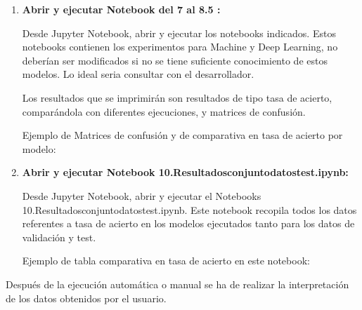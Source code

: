 \begin{enumerate}
\begin{enumerate}
 
    \item
    \textbf{Abrir y ejecutar Notebook del 7 al 8.5 :} 
    
    Desde Jupyter Notebook, abrir y ejecutar los notebooks indicados.
    Estos notebooks contienen los experimentos para Machine y Deep Learning, no deberían ser modificados si no se tiene suficiente conocimiento de estos modelos. Lo ideal seria consultar con el desarrollador.
    
    Los resultados que se imprimirán son resultados de tipo tasa de acierto, comparándola con diferentes ejecuciones, y matrices de confusión.
    
    Ejemplo de Matrices de confusión y de comparativa en tasa de acierto por modelo:
    
    
    
   \item
    \textbf{Abrir y ejecutar Notebook 10.Resultadosconjuntodatostest.ipynb:} 
    
    Desde Jupyter Notebook, abrir y ejecutar el Notebooks 10.Resultadosconjuntodatostest.ipynb.
    Este notebook recopila todos los datos referentes a tasa de acierto en los modelos ejecutados tanto para los datos de validación y test.
    
    Ejemplo de tabla comparativa en tasa de acierto en este notebook:
    
    
	\end{enumerate}  
	
	Después de la ejecución automática o manual se ha de realizar la interpretación de los datos obtenidos por el usuario.

\end{enumerate} 

